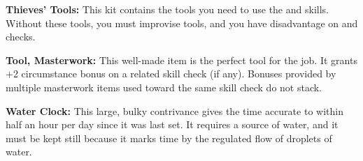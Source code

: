 \textbf{Thieves' Tools:} This kit contains the tools you need to use the  and  skills. Without these tools, you must improvise tools, and you have disadvantage on  and  checks.

\textbf{Tool, Masterwork:} This well-made item is the perfect tool for the job. It grants +2 circumstance bonus on a related skill check (if any). Bonuses provided by multiple masterwork items used toward the same skill check do not stack.

\textbf{Water Clock:} This large, bulky contrivance gives the time accurate to within half an hour per day since it was last set. It requires a source of water, and it must be kept still because it marks time by the regulated flow of droplets of water.